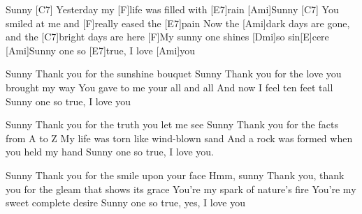 
\sloka
[Ami]Sunny [C7]
Yesterday my [F]life was filled with [E7]rain
[Ami]Sunny [C7]
You smiled at me and [F]really eased the [E7]pain
Now the [Ami]dark days are gone, and the [C7]bright days are here
[F]My sunny one shines [Dmi]so sin[E]cere
[Ami]Sunny one so [E7]true, I love [Ami]you

\sloka
Sunny
Thank you for the sunshine bouquet
Sunny
Thank you for the love you brought my way
You gave to me your all and all
And now I feel ten feet tall
Sunny one so true, I love you

\sloka
Sunny
Thank you for the truth you let me see
Sunny
Thank you for the facts from A to Z
My life was torn like wind-blown sand
And a rock was formed when you held my hand
Sunny one so true, I love you.

\sloka
Sunny
Thank you for the smile upon your face
Hmm, sunny
Thank you, thank you for the gleam that shows its grace
You're my spark of nature's fire
You're my sweet complete desire
Sunny one so true, yes, I love you
